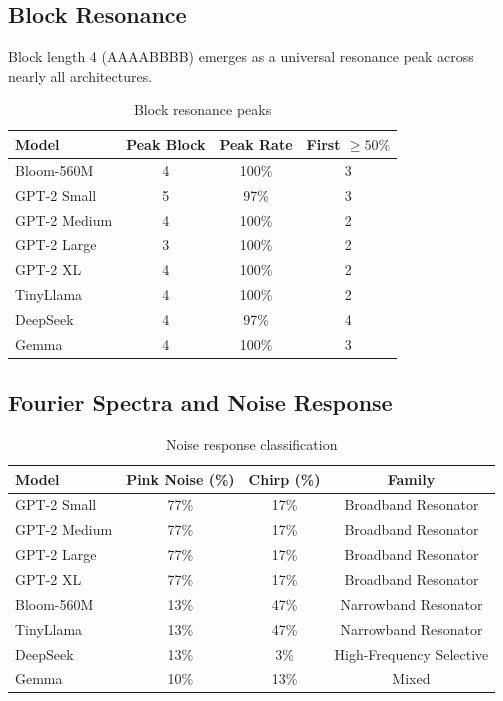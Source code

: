 \documentclass{article}
\begin{document}
\subsection{Block Resonance}

Block length 4 (AAAABBBB) emerges as a universal resonance peak across nearly all architectures.

\begin{table}[H]
\centering
\caption{Block resonance peaks}
\label{tab:block}
\begin{tabular}{lccc}
\toprule
Model & Peak Block & Peak Rate & First $\geq 50\%$ \\
\midrule
Bloom-560M & 4 & 100\% & 3 \\
GPT-2 Small & 5 & 97\% & 3 \\
GPT-2 Medium & 4 & 100\% & 2 \\
GPT-2 Large & 3 & 100\% & 2 \\
GPT-2 XL & 4 & 100\% & 2 \\
TinyLlama & 4 & 100\% & 2 \\
DeepSeek & 4 & 97\% & 4 \\
Gemma & 4 & 100\% & 3 \\
\bottomrule
\end{tabular}
\end{table}

\subsection{Fourier Spectra and Noise Response}

\begin{table}[H]
\centering
\caption{Noise response classification}
\label{tab:noise}
\begin{tabular}{lccc}
\toprule
Model & Pink Noise (\%) & Chirp (\%) & Family \\
\midrule
GPT-2 Small & 77\% & 17\% & Broadband Resonator \\
GPT-2 Medium & 77\% & 17\% & Broadband Resonator \\
GPT-2 Large & 77\% & 17\% & Broadband Resonator \\
GPT-2 XL & 77\% & 17\% & Broadband Resonator \\
Bloom-560M & 13\% & 47\% & Narrowband Resonator \\
TinyLlama & 13\% & 47\% & Narrowband Resonator \\
DeepSeek & 13\% & 3\% & High-Frequency Selective \\
Gemma & 10\% & 13\% & Mixed \\
\bottomrule
\end{tabular}
\end{table}
\end{document}
